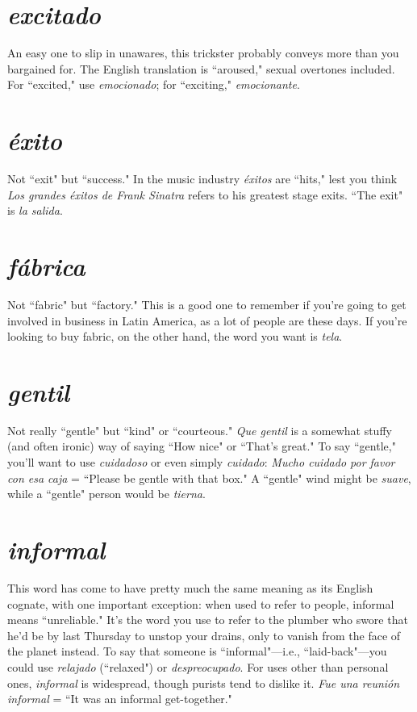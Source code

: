 \section{\emph{excitado}}

An easy one to slip in unawares, this trickster
probably conveys more than you bargained for. The English translation
is ``aroused," sexual overtones included. For ``excited," use \emph{emocionado}; for ``exciting," \emph{emocionante}.

\section{\emph{éxito}}

Not ``exit" but ``success." In the music industry \emph{éxitos}
are ``hits," lest you think \emph{Los grandes éxitos de Frank Sinatra} refers to
his greatest stage exits. ``The exit" is \emph{la salida}.

\section{\emph{fábrica}}

Not ``fabric" but ``factory." This is a good one to remember if you're going to get involved in business in Latin America, as
a lot of people are these days. If you're looking to buy fabric, on the
other hand, the word you want is \emph{tela}.

\section{\emph{gentil}}

Not really ``gentle" but ``kind" or ``courteous." \emph{Que
	gentil} is a somewhat stuffy (and often ironic) way of saying ``How
nice" or ``That's great." To say ``gentle," you'll want to use \emph{cuidadoso}
or even simply \emph{cuidado}: \emph{Mucho cuidado por favor con esa caja} =
``Please be gentle with that box." A ``gentle" wind might be \emph{suave},
while a ``gentle" person would be \emph{tierna}.

\section{\emph{informal}}

This word has come to have pretty much the
same meaning as its English cognate, with one important exception:
when used to refer to people, informal means ``unreliable." It's the
word you use to refer to the plumber who swore that he'd be by last
Thursday to unstop your drains, only to vanish from the face of the
planet instead. To say that someone is ``informal"---i.e., ``laid-back"---you could use \emph{relajado} (``relaxed") or \emph{despreocupado}. For uses other
than personal ones, \emph{informal} is widespread, though purists tend to dislike it. \emph{Fue una reunión informal} = ``It was an informal get-together."

